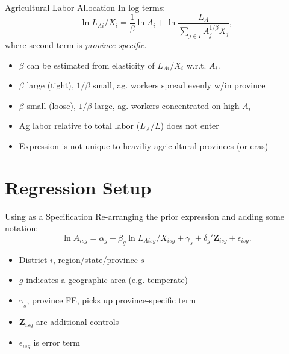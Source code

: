 \documentclass[10pt, xcolor=dvipsnames]{beamer}
\begin{document}
\begin{frame}{Agricultural Labor Allocation}
In log terms:
\begin{equation}
\ln L_{Ai}/X_i = \frac{1}{\beta} \ln A_{i} + \ln \frac{L_A}{\sum_{j\in I} A_{j}^{1/\beta}X_{j}}, \label{EQ_est}
\end{equation}
where second term is \textit{province-specific}. 

\begin{itemize}
  \item $\beta$ can be estimated from elasticity of $L_{Ai}/X_i$ w.r.t. $A_i$. 
  \item $\beta$ large (tight), $1/\beta$ small, ag. workers spread evenly w/in province
  \item $\beta$ small (loose), $1/\beta$ large, ag. workers concentrated on high $A_i$
  \item Ag labor relative to total labor ($L_A/L$) does not enter
  \item Expression is not unique to heaviliy agricultural provinces (or eras)
\end{itemize}

\hfill \hyperlink{extend}{}
\end{frame}

\section{Regression Setup}

\begin{frame}{Using as a Specification}
Re-arranging the prior expression and adding some notation:
\begin{equation}
  \ln A_{isg} = \alpha_g + \beta_g \ln L_{Aisg}/X_{isg} + \gamma_{s} + \delta_g' \mathbf{Z}_{isg} + \epsilon_{isg}. \label{EQ_regress}
\end{equation}

\begin{itemize}
  \item District $i$, region/state/province $s$
  \item $g$ indicates a geographic area (e.g. temperate)
  \item $\gamma_{s}$, province FE, picks up province-specific term
  \item $\mathbf{Z}_{isg}$ are additional controls
  \item $\epsilon_{isg}$ is error term
\end{itemize}
\end{frame}
\end{document}
